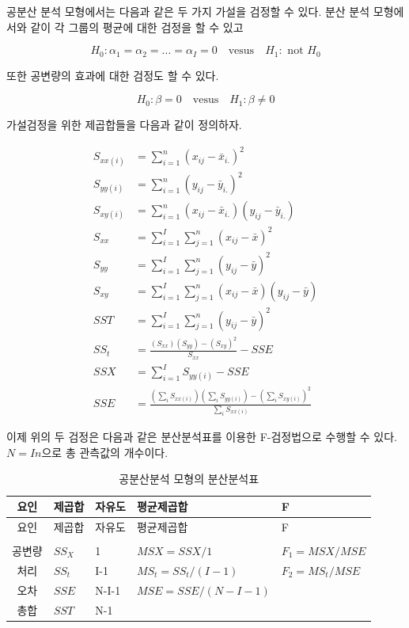 \documentclass[
  10pt,
]{book}
\theoremstyle{definition}
\theoremstyle{definition}
\theoremstyle{definition}
\theoremstyle{definition}
\theoremstyle{remark}
\begin{document}
공분산 분석 모형에서는 다음과 같은 두 가지 가설을 검정할 수 있다. 분산 분석 모형에서와 같이 각 그룹의 평균에 대한 검정을 할 수 있고

\begin{equation*}
H_0: \alpha_1 = \alpha_2 =...=\alpha_I =0  \quad \text{vesus} \quad H_1: \text{ not } H_0 
\end{equation*}

또한 공변량의 효과에 대한 검정도 할 수 있다.

\begin{equation} 
H_0: \beta =0  \quad \text{vesus} \quad H_1: \beta \ne 0 
\label{eq:hypoancova}
\end{equation}

가설검정을 위한 제곱합들을 다음과 같이 정의하자.

\begin{align*}
S_{xx(i)} & = \sum_{i=1}^n (x_{ij} - \bar x_{i.})^2 \\
S_{yy(i)} & = \sum_{i=1}^n (y_{ij} - \bar y_{i.})^2 \\
S_{xy(i)} & = \sum_{i=1}^n (x_{ij} - \bar x_{i.})(y_{ij} - \bar y_{i.}) \\
S_{xx} & = \sum_{i=1}^I \sum_{j=1}^n (x_{ij} - \bar x)^2 \\
S_{yy} & = \sum_{i=1}^I \sum_{j=1}^n (y_{ij} - \bar y)^2 \\
S_{xy} & = \sum_{i=1}^I \sum_{j=1}^n (x_{ij} - \bar x)(y_{ij} - \bar y)\\
SST & = \sum_{i=1}^I \sum_{j=1}^n (y_{ij} - \bar y)^2 \\
SS_t & = \frac{(S_{xx})(S_{yy}) -(S_{xy})^2}{S_{xx}} -SSE \\
SSX & = \sum_{i=1}^I S_{yy(i)} -SSE \\
SSE & = \frac{(\sum_i S_{xx(i)})(\sum_i S_{yy(i)})-(\sum_i S_{xy(i)})^2}{\sum_i S_{xx(i)}}
\end{align*}

이제 위의 두 검정은 다음과 같은 분산분석표를 이용한 F-검정법으로 수행할 수 있다. \(N=In\)으로 총 관측값의 개수이다.

\begin{longtable}[]{@{}cllll@{}}
\caption{공분산분석 모형의 분산분석표}\tabularnewline
\toprule
요인 & 제곱합 & 자유도 & 평균제곱합 & F\tabularnewline
\midrule
\endfirsthead
\toprule
요인 & 제곱합 & 자유도 & 평균제곱합 & F\tabularnewline
\midrule
\endhead
& & & &\tabularnewline
공변량 & \(SS_X\) & 1 & \(MSX = SSX/1\) & \(F_1 = MSX / MSE\)\tabularnewline
처리 & \(SS_t\) & I-1 & \(MS_t = SS_t/(I-1)\) & \(F_2 = MS_t / MSE\)\tabularnewline
오차 & \(SSE\) & N-I-1 & \(MSE = SSE/(N-I-1)\) &\tabularnewline
총합 & \(SST\) & N-1 & &\tabularnewline
\bottomrule
\end{longtable}
\end{document}
